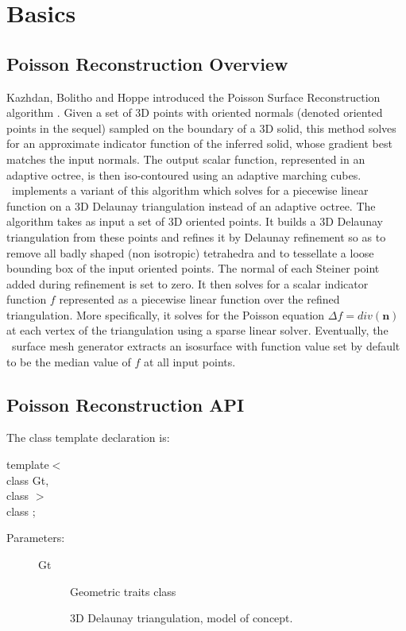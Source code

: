 \section{Basics}


\subsection{Poisson Reconstruction Overview}

Kazhdan, Bolitho and Hoppe introduced the Poisson Surface Reconstruction algorithm \cite{Kazhdan06}. Given a set of 3D points with oriented normals (denoted oriented points in the sequel) sampled on the boundary of a 3D solid, this method solves for an approximate indicator function of the inferred solid, whose gradient best matches the input normals. The output scalar function, represented in an adaptive octree, is then iso-contoured using an adaptive marching cubes.\\

\cgal\ implements a variant of this algorithm which solves for a piecewise linear function on a 3D Delaunay triangulation instead of an adaptive octree. The algorithm takes as input a set of 3D oriented points. It builds a 3D Delaunay triangulation from these points and refines it by Delaunay refinement so as to remove all badly shaped (non isotropic) tetrahedra and to tessellate a loose bounding box of the input oriented points. The normal of each Steiner point added during refinement is set to zero. It then solves for a scalar indicator function $f$ represented as a piecewise linear function over the refined triangulation. More specifically, it solves for the Poisson equation  $\Delta f = div(\mathbf{n})$ at each vertex of the triangulation using a sparse linear solver. Eventually, the \cgal\ surface mesh generator extracts an isosurface with function value set by default to be the median value of $f$ at all input points.

\subsection{Poisson Reconstruction API}

The class template declaration is:

template$<$  \\
class Gt,   \\
class $>$   \\
class ;
\ccGlue
\begin{description}
\item[Parameters:]
\begin{description}
\item[Gt]Geometric traits class \item[]3D Delaunay triangulation, model of  concept. \end{description}
\end{description}

